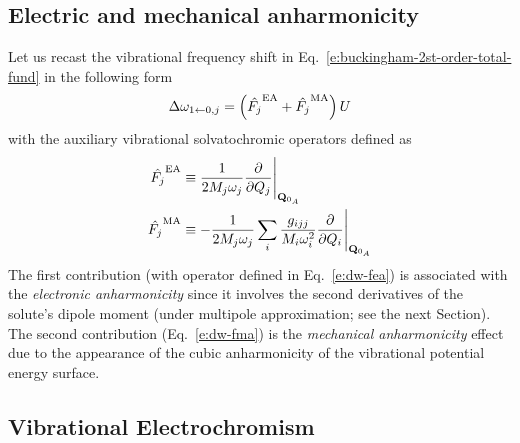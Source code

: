 \documentclass[a4paper,titlepage,twoside,fleqn,12pt]{book}
\begin{document}
\begin{refsection}
\subsection{Electric and mechanical anharmonicity}

Let us recast the vibrational frequency shift in Eq.~\eqref{e:buckingham-2st-order-total-fund}
in the following form
%
\begin{equation} 
 \Delta\omega_{1\leftarrow 0,j} = \left( \hat{F_j}^{\rm EA} + \hat{F_j}^{\rm MA}\right) U
\end{equation}
%
with the auxiliary vibrational solvatochromic operators defined as
%
\begin{subequations} \label{e:dw-fea-fma}
 \begin{align}
  \hat{F_j}^{\rm EA} &\equiv  \frac{1}{2M_j\omega_j} \frac{\partial}{\partial Q_j} \Bigg|_{{\bf Q}_{0_A}} 
         \label{e:dw-fea}\\
  \hat{F_j}^{\rm MA} &\equiv -\frac{1}{2M_j\omega_j} 
             \sum_i \frac{g_{ijj}}{M_i\omega_i^2} \frac{\partial}{\partial Q_i} \Bigg|_{{\bf Q}_{0_A}} 
         \label{e:dw-fma}
 \end{align}
\end{subequations}
%
The first contribution (with operator defined in Eq.~\eqref{e:dw-fea}) 
is associated with the \emph{electronic anharmonicity}
since it involves the second derivatives of the solute's dipole
moment (under multipole approximation; see the next Section). 
The second contribution (Eq.~\eqref{e:dw-fma})
is the \emph{mechanical anharmonicity} effect due to the appearance of the 
cubic anharmonicity of the vibrational potential energy surface.

\subsection{Vibrational Electrochromism}


\end{refsection}
\end{document}
